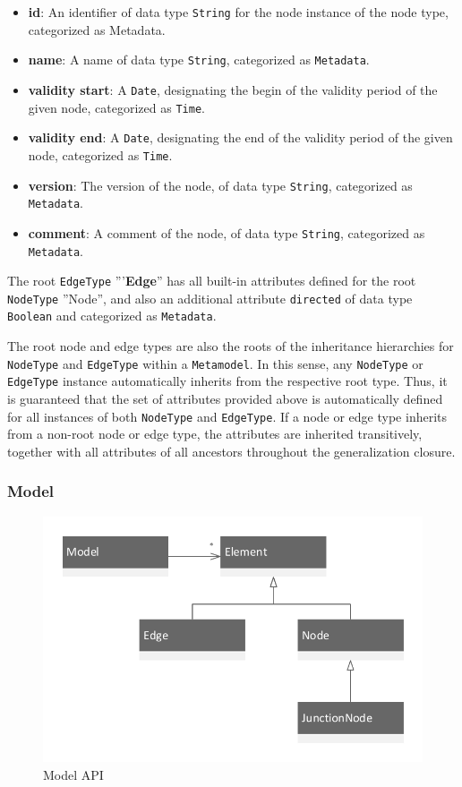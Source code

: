 \begin{itemize}
\item \textbf{id}: An identifier of data type \texttt{String} for the node instance of the node type, categorized as Metadata.
\item \textbf{name}: A name of data type \texttt{String}, categorized as \texttt{Metadata}.
\item \textbf{validity start}: A \texttt{Date}, designating the begin of the validity period of the given node, categorized as \texttt{Time}.
\item \textbf{validity end}: A \texttt{Date}, designating the end of the validity period of the given node, categorized as \texttt{Time}.
\item \textbf{version}: The version of the node, of data type \texttt{String}, categorized as \texttt{Metadata}.
\item \textbf{comment}: A comment of the node, of data type \texttt{String}, categorized as \texttt{Meta\-data}.
\end{itemize}

The root \texttt{EdgeType} '''\textbf{Edge}'' has all built-in attributes defined for the root \texttt{NodeType} ''Node'', and also an additional attribute \texttt{directed} of data type \texttt{Boolean} and categorized as \texttt{Metadata}. 

The root node and edge types are also the roots of the inheritance hierarchies for \texttt{NodeType} and \texttt{EdgeType} within a \texttt{Metamodel}. In this sense, any \texttt{NodeType} or \texttt{EdgeType} instance automatically inherits from the respective root type. Thus, it is guaranteed that the set of attributes provided above is automatically defined for all instances of both \texttt{NodeType} and \texttt{EdgeType}. If a node or edge type inherits from a non-root node or edge type, the attributes are inherited transitively, together with all attributes of all ancestors throughout the generalization closure.

\subsubsection{Model}

\begin{figure}
\centering
\includegraphics[scale=0.75]{figures/model.pdf}
\caption{Model API}
\label{fig:model}
\end{figure}

